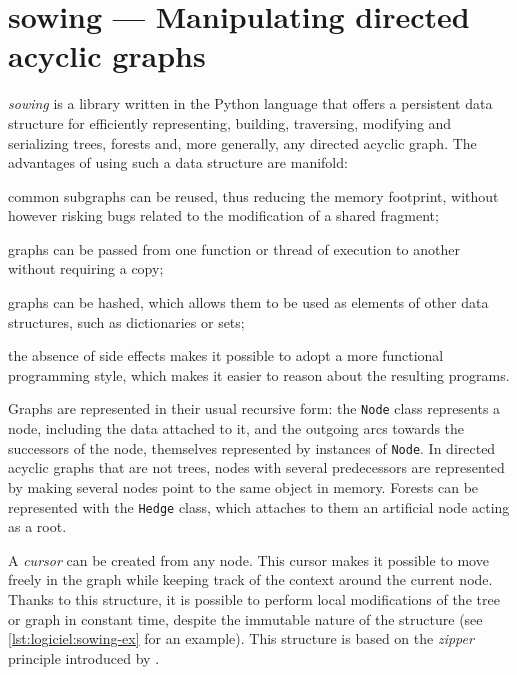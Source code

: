 \section{sowing --- Manipulating directed acyclic graphs}

\emph{sowing} is a library written in the Python language that offers a persistent data structure for efficiently representing, building, traversing, modifying and serializing trees, forests and, more generally, any directed acyclic graph.
The advantages of using such a data structure are manifold:
\begin{compactitemize}
    \item common subgraphs can be reused, thus reducing the memory footprint, without however risking bugs related to the modification of a shared fragment;
    \item graphs can be passed from one function or thread of execution to another without requiring a copy;
    \item graphs can be hashed, which allows them to be used as elements of other data structures, such as dictionaries or sets;
    \item the absence of side effects makes it possible to adopt a more functional programming style, which makes it easier to reason about the resulting programs.
\end{compactitemize}

Graphs are represented in their usual recursive form: the \texttt{Node} class represents a node, including the data attached to it, and the outgoing arcs towards the successors of the node, themselves represented by instances of \texttt{Node}.
In directed acyclic graphs that are not trees, nodes with several predecessors are represented by making several nodes point to the same object in memory.
Forests can be represented with the \texttt{Hedge} class, which attaches to them an artificial node acting as a root.

A \emph{cursor} can be created from any node.
This cursor makes it possible to move freely in the graph while keeping track of the context around the current node.
Thanks to this structure, it is possible to perform local modifications of the tree or graph in constant time, despite the immutable nature of the structure (see \cref{lst:logiciel:sowing-ex} for an example).
This structure is based on the \emph{zipper} principle introduced by \textcite{Huet1997Zipper}.

